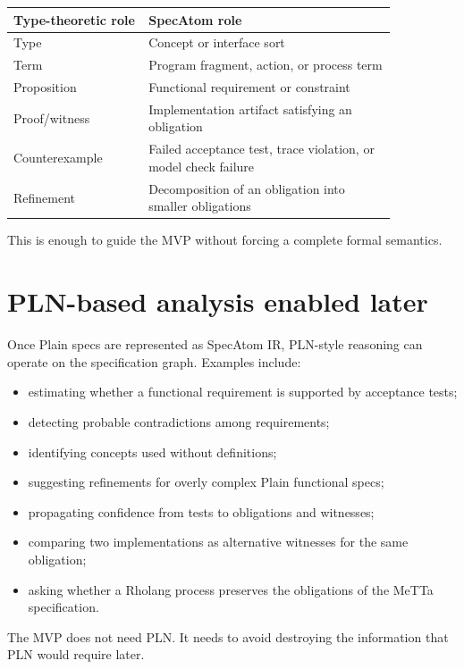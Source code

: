 \documentclass[11pt]{article}
\begin{document}
\begin{center}
\begin{tabular}{>{\raggedright\arraybackslash}p{0.3\linewidth} >{\raggedright\arraybackslash}p{0.55\linewidth}}
Type-theoretic role & SpecAtom role \\
\hline
Type & Concept or interface sort \\
Term & Program fragment, action, or process term \\
Proposition & Functional requirement or constraint \\
Proof/witness & Implementation artifact satisfying an obligation \\
Counterexample & Failed acceptance test, trace violation, or model check failure \\
Refinement & Decomposition of an obligation into smaller obligations \\
\end{tabular}
\end{center}

This is enough to guide the MVP without forcing a complete formal semantics.

\section{PLN-based analysis enabled later}

Once Plain specs are represented as SpecAtom IR, PLN-style reasoning can operate
on the specification graph. Examples include:

\begin{itemize}[nosep]
\item estimating whether a functional requirement is supported by acceptance tests;
\item detecting probable contradictions among requirements;
\item identifying concepts used without definitions;
\item suggesting refinements for overly complex Plain functional specs;
\item propagating confidence from tests to obligations and witnesses;
\item comparing two implementations as alternative witnesses for the same
obligation;
\item asking whether a Rholang process preserves the obligations of the MeTTa
specification.
\end{itemize}

The MVP does not need PLN. It needs to avoid destroying the information that PLN
would require later.
\end{document}
